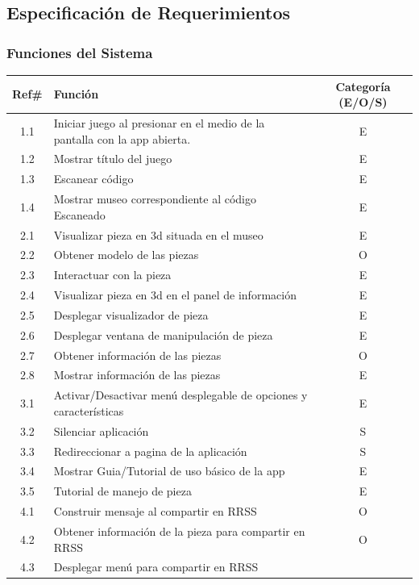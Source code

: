\subsection{Especificación de Requerimientos}

\subsubsection{Funciones del Sistema}

\begin{longtable}{|c|p{10cm}|c|}
\hline 
Ref\# & Función & Categoría (E/O/S) \\ 
\hline 
1.1 & Iniciar juego al presionar en el medio de la pantalla con la app abierta. & E \\ 
\hline 
1.2 & Mostrar título del juego & E \\ 
\hline 
1.3 & Escanear código & E \\ 
\hline 
1.4 & Mostrar museo correspondiente al código Escaneado & E \\ 
\hline 
2.1 & Visualizar pieza en 3d situada en el museo & E \\ 
\hline 
2.2 & Obtener modelo de las piezas & O \\ 
\hline 
2.3 & Interactuar con la pieza & E \\ 
\hline 
2.4 & Visualizar pieza en 3d en el panel de información & E \\ 
\hline 
2.5 & Desplegar visualizador de pieza & E \\ 
\hline 
2.6 & Desplegar ventana de manipulación de pieza & E \\ 
\hline 
2.7 & Obtener información de las piezas & O \\ 
\hline 
2.8 & Mostrar información de las piezas & E \\ 
\hline 
3.1 & Activar/Desactivar menú desplegable de opciones y características & E \\ 
\hline 
3.2 & Silenciar aplicación & S \\ 
\hline 
3.3 & Redireccionar a pagina de la aplicación & S \\ 
\hline 
3.4 & Mostrar Guia/Tutorial de uso básico de la app & E \\ 
\hline 
3.5 & Tutorial de manejo de pieza & E \\ 
\hline 
4.1 & Construir mensaje al compartir en RRSS & O \\ 
\hline 
4.2 & Obtener información de la pieza para compartir en RRSS & O \\ 
\hline 
4.3 & 
Desplegar menú para compartir en RRSS

\end{longtable}
